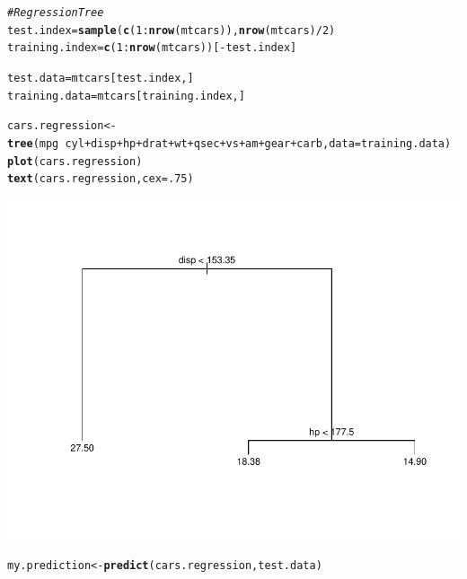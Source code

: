 \documentclass{article}\usepackage[]{graphicx}\usepackage[]{color}
\makeatletter
\def\maxwidth{ %
  \ifdim\Gin@nat@width>\linewidth
    \linewidth
  \else
    \Gin@nat@width
  \fi
}
\newcommand{\hlnum}[1]{\textcolor[rgb]{0.686,0.059,0.569}{#1}}%
\newcommand{\hlcom}[1]{\textcolor[rgb]{0.678,0.584,0.686}{\textit{#1}}}%
\newcommand{\hlopt}[1]{\textcolor[rgb]{0,0,0}{#1}}%
\newcommand{\hlstd}[1]{\textcolor[rgb]{0.345,0.345,0.345}{#1}}%
\newcommand{\hlkwb}[1]{\textcolor[rgb]{0.69,0.353,0.396}{#1}}%
\newcommand{\hlkwc}[1]{\textcolor[rgb]{0.333,0.667,0.333}{#1}}%
\newcommand{\hlkwd}[1]{\textcolor[rgb]{0.737,0.353,0.396}{\textbf{#1}}}%
\newenvironment{kframe}{%
 \def\at@end@of@kframe{}%
 \ifinner\ifhmode%
  \def\at@end@of@kframe{\end{minipage}}%
  \begin{minipage}{\columnwidth}%
 \fi\fi%
 \def\FrameCommand##1{\hskip\@totalleftmargin \hskip-\fboxsep
 \colorbox{shadecolor}{##1}\hskip-\fboxsep
     \hskip-\linewidth \hskip-\@totalleftmargin \hskip\columnwidth}%
 \MakeFramed {\advance\hsize-\width
   \@totalleftmargin\z@ \linewidth\hsize
   \@setminipage}}%
 {\par\unskip\endMakeFramed%
 \at@end@of@kframe}
\newenvironment{knitrout}{}{} %
\makeatother
\begin{document}
\begin{knitrout}
\color{fgcolor}\begin{kframe}
\begin{alltt}
\hlcom{# Regression Tree}
\hlstd{test.index} \hlkwb{=} \hlkwd{sample}\hlstd{(}\hlkwd{c}\hlstd{(}\hlnum{1}\hlopt{:}\hlkwd{nrow}\hlstd{(mtcars)),}\hlkwd{nrow}\hlstd{(mtcars)}\hlopt{/}\hlnum{2} \hlstd{)}
\hlstd{training.index}\hlkwb{=} \hlkwd{c}\hlstd{(}\hlnum{1}\hlopt{:}\hlkwd{nrow}\hlstd{(mtcars))[}\hlopt{-}\hlstd{test.index]}

\hlstd{test.data} \hlkwb{=} \hlstd{mtcars[test.index,]}
\hlstd{training.data} \hlkwb{=} \hlstd{mtcars[training.index,]}

\hlstd{cars.regression} \hlkwb{<-} \hlkwd{tree}\hlstd{(mpg} \hlopt{~} \hlstd{cyl}\hlopt{+}\hlstd{disp}\hlopt{+}\hlstd{hp}\hlopt{+}\hlstd{drat}\hlopt{+}\hlstd{wt}\hlopt{+}\hlstd{qsec}\hlopt{+}\hlstd{vs}\hlopt{+}\hlstd{am}\hlopt{+}\hlstd{gear}\hlopt{+}\hlstd{carb,} \hlkwc{data}\hlstd{=training.data)}
\hlkwd{plot}\hlstd{(cars.regression )}
\hlkwd{text}\hlstd{(cars.regression ,} \hlkwc{cex}\hlstd{=}\hlnum{.75}\hlstd{)}
\end{alltt}
\end{kframe}
\includegraphics[width=\maxwidth]{figure/unnamed-chunk-2-1} 
\begin{kframe}\begin{alltt}
\hlstd{my.prediction} \hlkwb{<-} \hlkwd{predict}\hlstd{(cars.regression, test.data)}


\end{alltt}
\end{kframe}
\end{knitrout}
\end{document}
